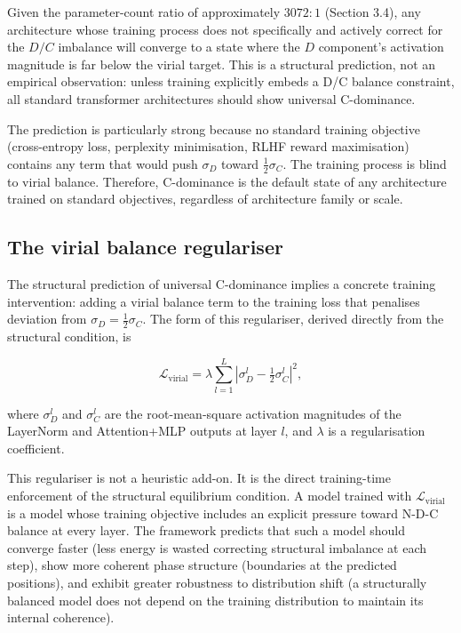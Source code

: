 \documentclass[12pt]{article}
\begin{document}
Given the parameter-count ratio of approximately \(3072:1\) (Section
3.4), any architecture whose training process does not specifically and
actively correct for the \(D/C\) imbalance will converge to a state
where the \(D\) component's activation magnitude is far below the virial
target. This is a structural prediction, not an empirical observation:
unless training explicitly embeds a D/C balance constraint, all standard
transformer architectures should show universal C-dominance.

The prediction is particularly strong because no standard training
objective (cross-entropy loss, perplexity minimisation, RLHF reward
maximisation) contains any term that would push \(\sigma_D\) toward
\(\frac{1}{2}\sigma_C\). The training process is blind to virial
balance. Therefore, C-dominance is the default state of any architecture
trained on standard objectives, regardless of architecture family or
scale.

\subsection{The virial balance regulariser}\label{the-virial-balance-regulariser}

The structural prediction of universal C-dominance implies a concrete
training intervention: adding a virial balance term to the training loss
that penalises deviation from \(\sigma_D = \frac{1}{2}\sigma_C\). The
form of this regulariser, derived directly from the structural
condition, is

\[\mathcal{L}_\text{virial} = \lambda \sum_{l=1}^{L} \left| \sigma_D^l - \tfrac{1}{2}\sigma_C^l \right|^2,\]

where \(\sigma_D^l\) and \(\sigma_C^l\) are the root-mean-square
activation magnitudes of the LayerNorm and Attention+MLP outputs at
layer \(l\), and \(\lambda\) is a regularisation coefficient.

This regulariser is not a heuristic add-on. It is the direct
training-time enforcement of the structural equilibrium condition. A
model trained with \(\mathcal{L}_\text{virial}\) is a model whose
training objective includes an explicit pressure toward N-D-C balance at
every layer. The framework predicts that such a model should converge
faster (less energy is wasted correcting structural imbalance at each
step), show more coherent phase structure (boundaries at the predicted
positions), and exhibit greater robustness to distribution shift (a
structurally balanced model does not depend on the training distribution
to maintain its internal coherence).
\end{document}
